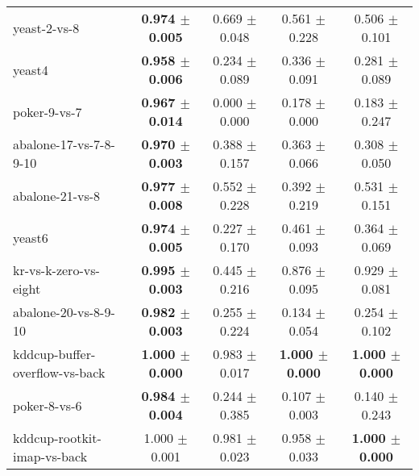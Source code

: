 \begin{table}[!ht]
{\begin{tabular}{l c c c c}
yeast-2-vs-8 & \textbf{0.974 $\pm$ 0.005} & 0.669 $\pm$ 0.048 & 0.561 $\pm$ 0.228 & 0.506 $\pm$ 0.101 \\
yeast4 & \textbf{0.958 $\pm$ 0.006} & 0.234 $\pm$ 0.089 & 0.336 $\pm$ 0.091 & 0.281 $\pm$ 0.089 \\
poker-9-vs-7 & \textbf{0.967 $\pm$ 0.014} & 0.000 $\pm$ 0.000 & 0.178 $\pm$ 0.000 & 0.183 $\pm$ 0.247 \\
abalone-17-vs-7-8-9-10 & \textbf{0.970 $\pm$ 0.003} & 0.388 $\pm$ 0.157 & 0.363 $\pm$ 0.066 & 0.308 $\pm$ 0.050 \\
abalone-21-vs-8 & \textbf{0.977 $\pm$ 0.008} & 0.552 $\pm$ 0.228 & 0.392 $\pm$ 0.219 & 0.531 $\pm$ 0.151 \\
yeast6 & \textbf{0.974 $\pm$ 0.005} & 0.227 $\pm$ 0.170 & 0.461 $\pm$ 0.093 & 0.364 $\pm$ 0.069 \\
kr-vs-k-zero-vs-eight & \textbf{0.995 $\pm$ 0.003} & 0.445 $\pm$ 0.216 & 0.876 $\pm$ 0.095 & 0.929 $\pm$ 0.081 \\
abalone-20-vs-8-9-10 & \textbf{0.982 $\pm$ 0.003} & 0.255 $\pm$ 0.224 & 0.134 $\pm$ 0.054 & 0.254 $\pm$ 0.102 \\
kddcup-buffer-overflow-vs-back & \textbf{1.000 $\pm$ 0.000} & 0.983 $\pm$ 0.017 & \textbf{1.000 $\pm$ 0.000} & \textbf{1.000 $\pm$ 0.000} \\
poker-8-vs-6 & \textbf{0.984 $\pm$ 0.004} & 0.244 $\pm$ 0.385 & 0.107 $\pm$ 0.003 & 0.140 $\pm$ 0.243 \\
kddcup-rootkit-imap-vs-back & 1.000 $\pm$ 0.001 & 0.981 $\pm$ 0.023 & 0.958 $\pm$ 0.033 & \textbf{1.000 $\pm$ 0.000} \\
\end{tabular}}
\end{table}

